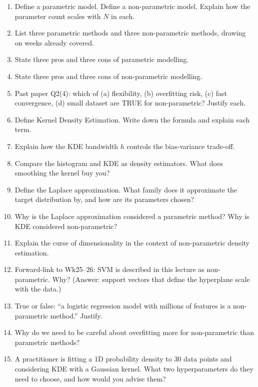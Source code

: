 \documentclass[11pt, a4paper]{article}
\begin{document}
\begin{enumerate}
  \item Define a parametric model. Define a non-parametric model. Explain how the parameter count scales with $N$ in each.
  \item List three parametric methods and three non-parametric methods, drawing on weeks already covered.
  \item State three pros and three cons of parametric modelling.
  \item State three pros and three cons of non-parametric modelling.
  \item Past paper Q2(4): which of (a) flexibility, (b) overfitting risk, (c) fast convergence, (d) small dataset are TRUE for non-parametric? Justify each.
  \item Define Kernel Density Estimation. Write down the formula and explain each term.
  \item Explain how the KDE bandwidth $h$ controls the bias-variance trade-off.
  \item Compare the histogram and KDE as density estimators. What does smoothing the kernel buy you?
  \item Define the Laplace approximation. What family does it approximate the target distribution by, and how are its parameters chosen?
  \item Why is the Laplace approximation considered a parametric method? Why is KDE considered non-parametric?
  \item Explain the curse of dimensionality in the context of non-parametric density estimation.
  \item Forward-link to Wk25--26: SVM is described in this lecture as non-parametric. Why? (Answer: support vectors that define the hyperplane scale with the data.)
  \item True or false: ``a logistic regression model with millions of features is a non-parametric method.'' Justify.
  \item Why do we need to be careful about overfitting more for non-parametric than parametric methods?
  \item A practitioner is fitting a 1D probability density to 30 data points and considering KDE with a Gaussian kernel. What two hyperparameters do they need to choose, and how would you advise them?
\end{enumerate}
\end{document}
